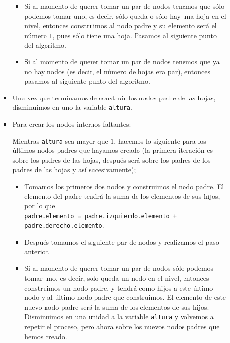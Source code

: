 \documentclass[letterpaper,11pt]{article}
\begin{document}
\begin{enumerate}
\begin{enumerate}
\begin{itemize}
\begin{itemize}
                \item Si al momento de querer tomar un par de nodos tenemos que 
                sólo podemos tomar uno, es decir, sólo queda o sólo hay una hoja 
                en el nivel, entonces construimos al nodo padre y su elemento 
                será el número $1$, pues sólo tiene una hoja. Pasamos al
                siguiente punto del algoritmo.

                \item Si al momento de querer tomar un par de nodos tenemos que 
                ya no hay nodos (es decir, el número de hojas era par), entonces 
                pasamos al siguiente punto del algoritmo.
            \end{itemize}

            \item Una vez que terminamos de construir los nodos padre de las
            hojas, disminuimos en uno la variable \texttt{altura}.

            \item Para crear los nodos internos faltantes:

            Mientras \texttt{altura} sea mayor que $1$, hacemos lo siguiente 
            para los últimos nodos padres que hayamos creado (la primera 
            iteración es sobre los padres de las hojas, después será sobre 
            los padres de los padres de las hojas y así sucesivamente); 
            \begin{itemize}
                
                \item Tomamos los primeros dos nodos y construimos el nodo 
                padre. El elemento del padre tendrá la suma de los elementos 
                de sus hijos, por lo que \\ 
                \texttt{padre.elemento = padre.izquierdo.elemento + 
                padre.derecho.elemento}.
    
                \item Después tomamos el siguiente par de nodos y realizamos 
                el paso anterior. 
                
                \item Si al momento de querer tomar un par de nodos sólo podemos 
                tomar uno, es decir, sólo queda un nodo en el nivel, entonces 
                construimos un nodo padre, y tendrá como hijos a este último nodo 
                y al último nodo padre que construimos. El elemento de este 
                nuevo nodo padre será la suma de los elementos de sus hijos. 
                Disminuimos en una unidad a la variable \texttt{altura} y 
                volvemos a repetir el proceso, pero ahora sobre los nuevos nodos 
                padres que hemos creado.


\end{itemize}
\end{itemize}
\end{enumerate}
\end{enumerate}
\end{document}

